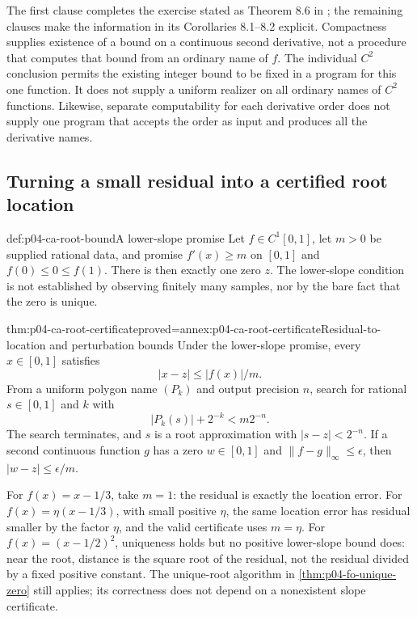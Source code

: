 The first clause completes the exercise stated as Theorem 8.6 in
\cite[pp.\ 50--51]{Bournez2024ComputableAnalysisAuthor}; the remaining
clauses make the information in its Corollaries 8.1--8.2 explicit.
Compactness supplies existence of a bound on a continuous second
derivative, not a procedure that computes that bound from an ordinary
name of \(f\). The individual \(C^2\) conclusion permits the existing
integer bound to be fixed in a program for this one function.
It does not supply a uniform realizer on all ordinary names of
\(C^2\) functions. Likewise, separate computability for each derivative
order does not supply one program that accepts the order as input and
produces all the derivative names.

\subsection{Turning a small residual into a certified root location}
\label{sec:p04-ca-root-certificates}

\begin{hbdefinition}{def:p04-ca-root-bound}{A lower-slope promise}
Let \(f\in C^1[0,1]\), let \(m>0\) be supplied rational data,
and promise \(f'(x)\geq m\) on \([0,1]\) and
\(f(0)\leq0\leq f(1)\). There is then exactly one zero \(z\).
The lower-slope condition is not established by observing finitely
many samples, nor by the bare fact that the zero is unique.
\end{hbdefinition}

\begin{hbtheorem}{thm:p04-ca-root-certificate}{proved=annex:p04-ca-root-certificate}{Residual-to-location and perturbation bounds}
Under the lower-slope promise, every \(x\in[0,1]\) satisfies
\[
 |x-z|\leq |f(x)|/m.
\]
From a uniform polygon name \((P_k)\) and output precision \(n\),
search for rational \(s\in[0,1]\) and \(k\) with
\[
 |P_k(s)|+2^{-k}<m2^{-n}.
\]
The search terminates, and \(s\) is a root approximation with
\(|s-z|<2^{-n}\). If a second continuous function \(g\) has
a zero \(w\in[0,1]\) and
\(\lVert f-g\rVert_\infty\leq\epsilon\), then
\(|w-z|\leq\epsilon/m\).
\end{hbtheorem}

For \(f(x)=x-1/3\), take \(m=1\): the residual is exactly
the location error. For \(f(x)=\eta(x-1/3)\), with small
positive \(\eta\), the same location error has residual smaller by
the factor \(\eta\), and the valid certificate uses \(m=\eta\).
For \(f(x)=(x-1/2)^2\), uniqueness holds but no positive lower-slope
bound does: near the root, distance is the square root of the residual,
not the residual divided by a fixed positive constant. The unique-root
algorithm in \cref{thm:p04-fo-unique-zero} still applies; its correctness
does not depend on a nonexistent slope certificate.

